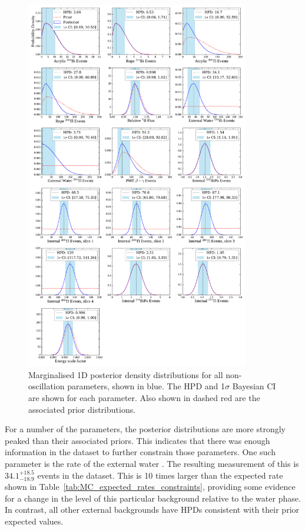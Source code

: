 \begin{figure}
    \centering
    \includegraphics[width=0.87\textwidth]{6_SolarAnalysis/images/posterior_densities_plot_no_osc.pdf}
    \caption[Marginalised 1D posterior density distributions for all non-oscillation parameters]
    {Marginalised 1D posterior density distributions for all non-oscillation parameters, shown in blue. The HPD and 1$\sigma$ Bayesian CI are shown for each parameter. Also shown in dashed red are the associated prior distributions.}
    \label{fig:nuisance_params_marged}
\end{figure}

For a number of the parameters, the posterior distributions are more strongly peaked than their associated priors. This indicates that there was enough information in the dataset to further constrain those parameters. One such parameter is the rate of the external water . The resulting measurement of this is $34.1^{+18.5}_{-18.9}$ events in the dataset. This is 10 times larger than the expected rate shown in Table~\ref{tab:MC_expected_rates_constraints}, providing some evidence for a change in the level of this particular background relative to the water phase. In contrast, all other external backgrounds have HPDs consistent with their prior expected values.

